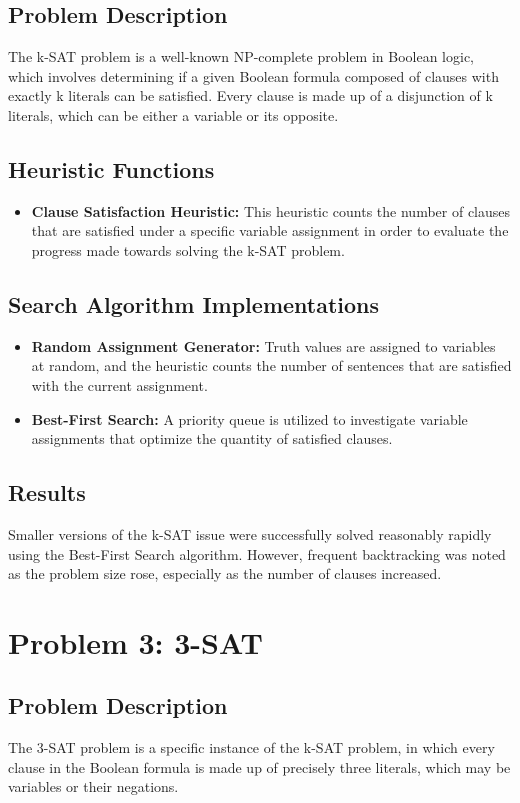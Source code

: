 \documentclass[conference]{IEEEtran}
\begin{document}
\subsection{Problem Description}
The k-SAT problem is a well-known NP-complete problem in Boolean logic, which involves determining if a given Boolean formula composed of clauses with exactly k literals can be satisfied. Every clause is made up of a disjunction of k literals, which can be either a variable or its opposite.

\subsection{Heuristic Functions}
\begin{itemize}
    \item \textbf{Clause Satisfaction Heuristic:} This heuristic counts the number of clauses that are satisfied under a specific variable assignment in order to evaluate the progress made towards solving the k-SAT problem.
\end{itemize}

\subsection{Search Algorithm Implementations}
\begin{itemize}
    \item \textbf{Random Assignment Generator:} Truth values are assigned to variables at random, and the heuristic counts the number of sentences that are satisfied with the current assignment.
    \item \textbf{Best-First Search:} A priority queue is utilized to investigate variable assignments that optimize the quantity of satisfied clauses.
\end{itemize}

\subsection{Results}
Smaller versions of the k-SAT issue were successfully solved reasonably rapidly using the Best-First Search algorithm. However, frequent backtracking was noted as the problem size rose, especially as the number of clauses increased.

\section{Problem 3: 3-SAT}
\subsection{Problem Description}
The 3-SAT problem is a specific instance of the k-SAT problem, in which every clause in the Boolean formula is made up of precisely three literals, which may be variables or their negations.
\end{document}
